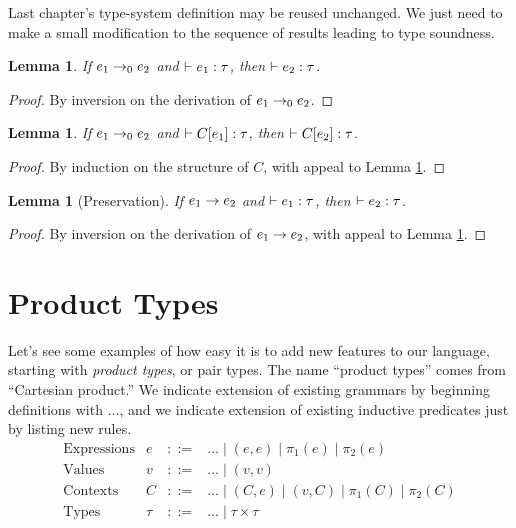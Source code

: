 \documentclass{amsbook}
\newtheorem{lemma}[theorem]{Lemma}
\theoremstyle{definition}
\theoremstyle{remark}
\numberwithin{section}{chapter}
\numberwithin{equation}{chapter}
\begin{document}
Last chapter's type-system definition may be reused unchanged.
We just need to make a small modification to the sequence of results leading to type soundness.

\begin{lemma}\label{preservation0}
  If $e_1 \to_0 e_2$ and $\vdash e_1 : \tau$, then $\vdash e_2 : \tau$.
\end{lemma}
\begin{proof}
  By inversion on the derivation of $e_1 \to_0 e_2$.
\end{proof}

\begin{lemma}\label{preservation_prime}
  If $e_1 \to_0 e_2$ and $\vdash C[e_1] : \tau$, then $\vdash C[e_2] : \tau$.
\end{lemma}
\begin{proof}
  By induction on the structure of $C$, with appeal to Lemma \ref{preservation0}.
\end{proof}

\begin{lemma}[Preservation]\label{preservation}
  If $e_1 \to e_2$ and $\vdash e_1 : \tau$, then $\vdash e_2 : \tau$.
\end{lemma}
\begin{proof}
  By inversion on the derivation of $e_1 \to e_2$, with appeal to Lemma \ref{preservation_prime}.
\end{proof}

\section{Product Types}

Let's see some examples of how easy it is to add new features to our language, starting with \emph{product types}, or pair types.
The name ``product types'' comes from ``Cartesian product.''
We indicate extension of existing grammars by beginning definitions with $\ldots$, and we indicate extension of existing inductive predicates just by listing new rules.
$$\begin{array}{rrcl}
  \textrm{Expressions} & e &::=& \ldots \mid (e, e) \mid \pi_1(e) \mid \pi_2(e) \\
  \textrm{Values} & v &::=& \ldots \mid (v, v) \\
  \textrm{Contexts} & C &::=& \ldots \mid (C, e) \mid (v, C) \mid \pi_1(C) \mid \pi_2(C) \\
  \textrm{Types} & \tau &::=& \ldots \mid \tau \times \tau
\end{array}$$
\end{document}
